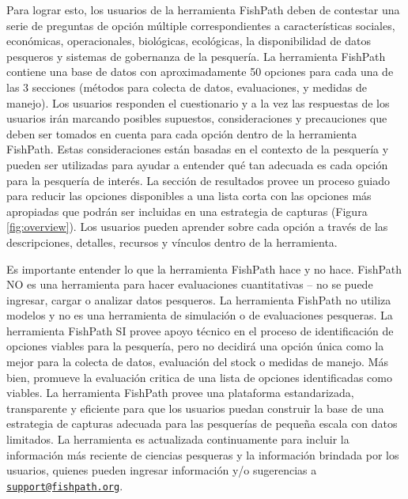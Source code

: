 \documentclass[
  11pt,
]{book}
\begin{document}
Para lograr esto, los usuarios de la herramienta FishPath deben de contestar una serie de preguntas de opción múltiple correspondientes a características sociales, económicas, operacionales, biológicas, ecológicas, la disponibilidad de datos pesqueros y sistemas de gobernanza de la pesquería. La herramienta FishPath contiene una base de datos con aproximadamente 50 opciones para cada una de las 3 secciones (métodos para colecta de datos, evaluaciones, y medidas de manejo). Los usuarios responden el cuestionario y a la vez las respuestas de los usuarios irán marcando posibles supuestos, consideraciones y precauciones que deben ser tomados en cuenta para cada opción dentro de la herramienta FishPath. Estas consideraciones están basadas en el contexto de la pesquería y pueden ser utilizadas para ayudar a entender qué tan adecuada es cada opción para la pesquería de interés. La sección de resultados provee un proceso guiado para reducir las opciones disponibles a una lista corta con las opciones más apropiadas que podrán ser incluidas en una estrategia de capturas (Figura \ref{fig:overview}). Los usuarios pueden aprender sobre cada opción a través de las descripciones, detalles, recursos y vínculos dentro de la herramienta.

Es importante entender lo que la herramienta FishPath hace y no hace. FishPath NO es una herramienta para hacer evaluaciones cuantitativas -- no se puede ingresar, cargar o analizar datos pesqueros. La herramienta FishPath no utiliza modelos y no es una herramienta de simulación o de evaluaciones pesqueras. La herramienta FishPath SI provee apoyo técnico en el proceso de identificación de opciones viables para la pesquería, pero no decidirá una opción única como la mejor para la colecta de datos, evaluación del stock o medidas de manejo. Más bien, promueve la evaluación critica de una lista de opciones identificadas como viables. La herramienta FishPath provee una plataforma estandarizada, transparente y eficiente para que los usuarios puedan construir la base de una estrategia de capturas adecuada para las pesquerías de pequeña escala con datos limitados. La herramienta es actualizada continuamente para incluir la información más reciente de ciencias pesqueras y la información brindada por los usuarios, quienes pueden ingresar información y/o sugerencias a \href{mailto:support@fishpath.org}{\nolinkurl{support@fishpath.org}}.
\end{document}
